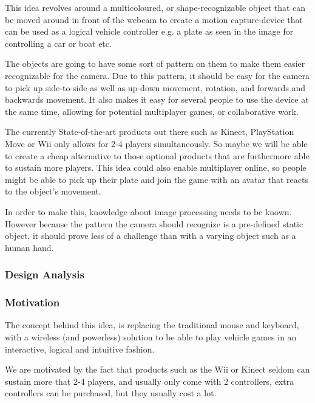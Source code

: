 This idea revolves around a multicoloured, or shape-recognizable object that can be moved around in front of the webcam to create a motion capture-device that can be used as a logical vehicle controller e.g. a plate as seen in the image for controlling a car or boat etc.

The objects are going to have some sort of pattern on them to make them easier recognizable for the camera. Due to this pattern, it should be easy for the camera to pick up side-to-side as well as up-down movement, rotation, and forwards and backwards movement. It also makes it easy for several people to use the device at the same time, allowing for potential multiplayer games, or collaborative work.
 
The currently State-of-the-art products out there such as Kinect, PlayStation Move or Wii only allows for 2-4 players simultaneously. So maybe we will be able to create a cheap alternative to those optional products that are furthermore able to sustain more players. This idea could also enable multiplayer online, so people might be able to pick up their plate and join the game with an avatar that reacts to the object’s movement.
	
In order to make this, knowledge about image processing needs to be known. However because the pattern the camera should recognize is a pre-defined static object, it should prove less of a challenge than with a varying object such as a human hand.

\subsubsection*{Design Analysis}
\subsubsection*{Motivation}
The concept behind this idea, is replacing the traditional mouse and keyboard, with a wireless (and powerless) solution to be able to play vehicle games in an interactive, logical and intuitive fashion. 

We are motivated by the fact that products such as the Wii or Kinect seldom can sustain more that 2-4 players, and usually only come with 2 controllers, extra controllers can be purchased, but they usually cost a lot.

